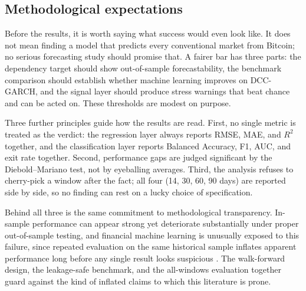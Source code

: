 \subsection{Methodological expectations}

Before the results, it is worth saying what success would even look like. It does not mean finding a model that predicts every conventional market from Bitcoin; no serious forecasting study should promise that. A fairer bar has three parts: the dependency target should show out-of-sample forecastability, the benchmark comparison should establish whether machine learning improves on DCC-GARCH, and the signal layer should produce stress warnings that beat chance and can be acted on. These thresholds are modest on purpose.

Three further principles guide how the results are read. First, no single metric is treated as the verdict: the regression layer always reports RMSE, MAE, and $R^2$ together, and the classification layer reports Balanced Accuracy, F1, AUC, and exit rate together. Second, performance gaps are judged significant by the Diebold--Mariano test, not by eyeballing averages. Third, the analysis refuses to cherry-pick a window after the fact; all four (14, 30, 60, 90 days) are reported side by side, so no finding can rest on a lucky choice of specification.

Behind all three is the same commitment to methodological transparency. In-sample performance can appear strong yet deteriorate substantially under proper out-of-sample testing, and financial machine learning is unusually exposed to this failure, since repeated evaluation on the same historical sample inflates apparent performance long before any single result looks suspicious \cite{lopezdeprado2018advances}. The walk-forward design, the leakage-safe benchmark, and the all-windows evaluation together guard against the kind of inflated claims to which this literature is prone.
